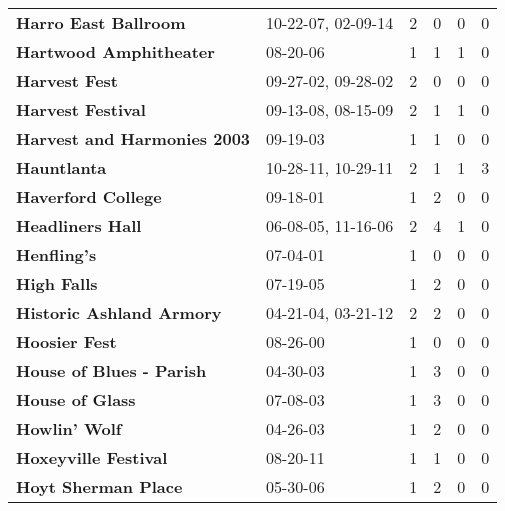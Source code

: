 \begin{supertabular}{p{0.4\textwidth}p{0.3\textwidth}p{0.05\textwidth}p{0.05\textwidth}p{0.05\textwidth}p{0.05\textwidth}}
                                         \textbf{Harro East Ballroom} &  10-22-07, 02-09-14 &  2 &  0 &  0 &  0 \\
                                       \textbf{Hartwood Amphitheater} &            08-20-06 &  1 &  1 &  1 &  0 \\
                                                \textbf{Harvest Fest} &  09-27-02, 09-28-02 &  2 &  0 &  0 &  0 \\
                                            \textbf{Harvest Festival} &  09-13-08, 08-15-09 &  2 &  1 &  1 &  0 \\
                                  \textbf{Harvest and Harmonies 2003} &            09-19-03 &  1 &  1 &  0 &  0 \\
                                                  \textbf{Hauntlanta} &  10-28-11, 10-29-11 &  2 &  1 &  1 &  3 \\
                                           \textbf{Haverford College} &            09-18-01 &  1 &  2 &  0 &  0 \\
                                             \textbf{Headliners Hall} &  06-08-05, 11-16-06 &  2 &  4 &  1 &  0 \\
                                                  \textbf{Henfling's} &            07-04-01 &  1 &  0 &  0 &  0 \\
                                                  \textbf{High Falls} &            07-19-05 &  1 &  2 &  0 &  0 \\
                                     \textbf{Historic Ashland Armory} &  04-21-04, 03-21-12 &  2 &  2 &  0 &  0 \\
                                                \textbf{Hoosier Fest} &            08-26-00 &  1 &  0 &  0 &  0 \\
                                     \textbf{House of Blues - Parish} &            04-30-03 &  1 &  3 &  0 &  0 \\
                                              \textbf{House of Glass} &            07-08-03 &  1 &  3 &  0 &  0 \\
                                                \textbf{Howlin' Wolf} &            04-26-03 &  1 &  2 &  0 &  0 \\
                                         \textbf{Hoxeyville Festival} &            08-20-11 &  1 &  1 &  0 &  0 \\
                                          \textbf{Hoyt Sherman Place} &            05-30-06 &  1 &  2 &  0 &  0 \\

\end{supertabular}
